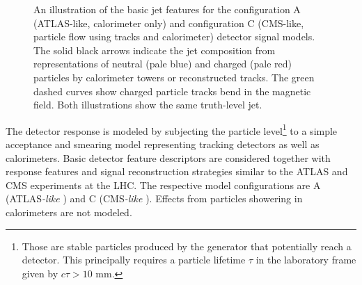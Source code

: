\documentclass[11pt,letterpaper]{article}
\begin{document}
\begin{figure}
\begin{center}
\end{center}
\caption{An illustration of the basic jet features for the configuration A (ATLAS-like, calorimeter only) and configuration C (CMS-like, particle flow using tracks and calorimeter) detector signal models. The solid black arrows indicate the jet composition from representations of neutral (pale blue) and charged (pale red) particles by calorimeter towers or reconstructed tracks. The green dashed curves show charged particle tracks bend in the magnetic field. Both illustrations show the same truth-level jet.}
\label{fig:detmodel}
\end{figure}


The detector response is modeled by subjecting the particle level\footnote{Those are stable particles produced by the generator that potentially reach a detector. 
This principally requires a particle lifetime $\tau$ in the laboratory frame given by $c\tau > 10$ mm.}
to a simple acceptance and smearing model representing tracking detectors as well as calorimeters.
Basic detector feature descriptors are considered together with response features and signal reconstruction strategies similar to the ATLAS and CMS experiments at the LHC.
The respective model configurations are A (ATLAS\emph{-like} \cite{PERF-2007-01}) and C (CMS\emph{-like} \cite{CMS-TDR-08-001}).
Effects from particles showering in calorimeters are not modeled. 
\end{document}
